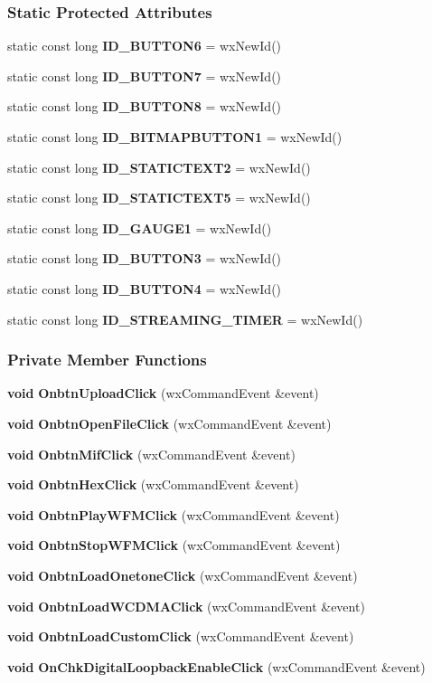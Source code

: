 \subsubsection*{Static Protected Attributes}
\begin{DoxyCompactItemize}
\item 
static const long {\bf I\+D\+\_\+\+B\+U\+T\+T\+O\+N6} = wx\+New\+Id()
\item 
static const long {\bf I\+D\+\_\+\+B\+U\+T\+T\+O\+N7} = wx\+New\+Id()
\item 
static const long {\bf I\+D\+\_\+\+B\+U\+T\+T\+O\+N8} = wx\+New\+Id()
\item 
static const long {\bf I\+D\+\_\+\+B\+I\+T\+M\+A\+P\+B\+U\+T\+T\+O\+N1} = wx\+New\+Id()
\item 
static const long {\bf I\+D\+\_\+\+S\+T\+A\+T\+I\+C\+T\+E\+X\+T2} = wx\+New\+Id()
\item 
static const long {\bf I\+D\+\_\+\+S\+T\+A\+T\+I\+C\+T\+E\+X\+T5} = wx\+New\+Id()
\item 
static const long {\bf I\+D\+\_\+\+G\+A\+U\+G\+E1} = wx\+New\+Id()
\item 
static const long {\bf I\+D\+\_\+\+B\+U\+T\+T\+O\+N3} = wx\+New\+Id()
\item 
static const long {\bf I\+D\+\_\+\+B\+U\+T\+T\+O\+N4} = wx\+New\+Id()
\item 
static const long {\bf I\+D\+\_\+\+S\+T\+R\+E\+A\+M\+I\+N\+G\+\_\+\+T\+I\+M\+ER} = wx\+New\+Id()
\end{DoxyCompactItemize}
\subsubsection*{Private Member Functions}
\begin{DoxyCompactItemize}
\item 
{\bf void} {\bf Onbtn\+Upload\+Click} (wx\+Command\+Event \&event)
\item 
{\bf void} {\bf Onbtn\+Open\+File\+Click} (wx\+Command\+Event \&event)
\item 
{\bf void} {\bf Onbtn\+Mif\+Click} (wx\+Command\+Event \&event)
\item 
{\bf void} {\bf Onbtn\+Hex\+Click} (wx\+Command\+Event \&event)
\item 
{\bf void} {\bf Onbtn\+Play\+W\+F\+M\+Click} (wx\+Command\+Event \&event)
\item 
{\bf void} {\bf Onbtn\+Stop\+W\+F\+M\+Click} (wx\+Command\+Event \&event)
\item 
{\bf void} {\bf Onbtn\+Load\+Onetone\+Click} (wx\+Command\+Event \&event)
\item 
{\bf void} {\bf Onbtn\+Load\+W\+C\+D\+M\+A\+Click} (wx\+Command\+Event \&event)
\item 
{\bf void} {\bf Onbtn\+Load\+Custom\+Click} (wx\+Command\+Event \&event)
\item 
{\bf void} {\bf On\+Chk\+Digital\+Loopback\+Enable\+Click} (wx\+Command\+Event \&event)
\end{DoxyCompactItemize}
